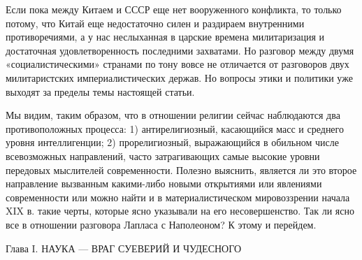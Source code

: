Если  пока  между  Китаем  и  СССР  еще  нет  вооруженного  конфликта,
то  только  потому,  что  Китай еще  недостаточно  силен  и  раздираем
внутренними  противоречиями, а  у  нас неслыханная  в царские  времена
милитаризация и достаточная удовлетворенность последними захватами. Но
разговор  между  двумя  «социалистическими»  странами  по  тону  вовсе
не  отличается от  разговоров  двух милитаристских  империалистических
держав.  Но вопросы  этики  и  политики уже  выходят  за пределы  темы
настоящей статьи.

Мы видим,  таким образом, что  в отношении религии  сейчас наблюдаются
два  противоположных  процесса:  1) антирелигиозный,  касающийся  масс
и  среднего  уровня  интеллигенции;  2)  прорелигиозный,  выражающийся
в  обильном   числе  всевозможных  направлений,   часто  затрагивающих
самые  высокие  уровни  передовых  мыслителей  современности.  Полезно
выяснить,  является ли  это второе  направление вызванным  какими-либо
новыми  открытиями или  явлениями современности  или можно  найти и  в
материалистическом мировоззрении  начала XIX  в. такие  черты, которые
ясно  указывали на  его несовершенство.  Так ли  ясно все  в отношении
разговора Лапласа с Наполеоном? К этому и перейдем.

Глава I. НАУКА --- ВРАГ СУЕВЕРИЙ И ЧУДЕСНОГО

